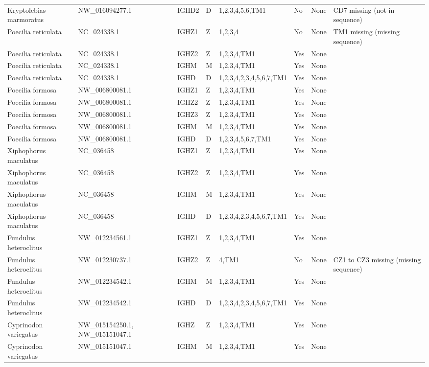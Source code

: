 \begin{tabular}{llllllll}
  Kryptolebias marmoratus & NW\_016094277.1 & IGHD2 & D & 1,2,3,4,5,6,TM1 & No & None & CD7 missing (not in sequence) \\ 
  Poecilia reticulata & NC\_024338.1 & IGHZ1 & Z & 1,2,3,4 & No & None & TM1 missing (missing sequence) \\ 
  Poecilia reticulata & NC\_024338.1 & IGHZ2 & Z & 1,2,3,4,TM1 & Yes & None &  \\ 
  Poecilia reticulata & NC\_024338.1 & IGHM & M & 1,2,3,4,TM1 & Yes & None &  \\ 
  Poecilia reticulata & NC\_024338.1 & IGHD & D & 1,2,3,4,2,3,4,5,6,7,TM1 & Yes & None &  \\ 
  Poecilia formosa & NW\_006800081.1 & IGHZ1 & Z & 1,2,3,4,TM1 & Yes & None &  \\ 
  Poecilia formosa & NW\_006800081.1 & IGHZ2 & Z & 1,2,3,4,TM1 & Yes & None &  \\ 
  Poecilia formosa & NW\_006800081.1 & IGHZ3 & Z & 1,2,3,4,TM1 & Yes & None &  \\ 
  Poecilia formosa & NW\_006800081.1 & IGHM & M & 1,2,3,4,TM1 & Yes & None &  \\ 
  Poecilia formosa & NW\_006800081.1 & IGHD & D & 1,2,3,4,5,6,7,TM1 & Yes & None &  \\ 
  Xiphophorus maculatus & NC\_036458 & IGHZ1 & Z & 1,2,3,4,TM1 & Yes & None &  \\ 
  Xiphophorus maculatus & NC\_036458 & IGHZ2 & Z & 1,2,3,4,TM1 & Yes & None &  \\ 
  Xiphophorus maculatus & NC\_036458 & IGHM & M & 1,2,3,4,TM1 & Yes & None &  \\ 
  Xiphophorus maculatus & NC\_036458 & IGHD & D & 1,2,3,4,2,3,4,5,6,7,TM1 & Yes & None &  \\ 
  Fundulus heteroclitus & NW\_012234561.1 & IGHZ1 & Z & 1,2,3,4,TM1 & Yes & None &  \\ 
  Fundulus heteroclitus & NW\_012230737.1 & IGHZ2 & Z & 4,TM1 & No & None & CZ1 to CZ3 missing (missing sequence) \\ 
  Fundulus heteroclitus & NW\_012234542.1 & IGHM & M & 1,2,3,4,TM1 & Yes & None &  \\ 
  Fundulus heteroclitus & NW\_012234542.1 & IGHD & D & 1,2,3,4,2,3,4,5,6,7,TM1 & Yes & None &  \\ 
  Cyprinodon variegatus & NW\_015154250.1, NW\_015151047.1 & IGHZ & Z & 1,2,3,4,TM1 & Yes & None &  \\ 
  Cyprinodon variegatus & NW\_015151047.1 & IGHM & M & 1,2,3,4,TM1 & Yes & None &  \\ 

\end{tabular}
